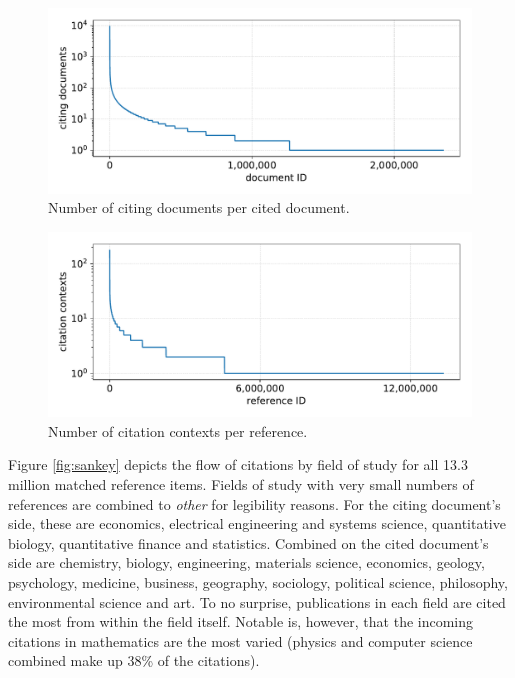\begin{figure}
  \centering
  \includegraphics[width=\linewidth]{figures/dataset/citing_docs_per_cited_doc.pdf}
  \caption{Number of citing documents per cited document.}
  \label{fig:numcitdoc}
\end{figure}

\begin{figure}
  \centering
  \includegraphics[width=\linewidth]{figures/dataset/citation_contexts_per_reference.pdf}
  \caption{Number of citation contexts per reference.}
  \label{fig:numcontref}
\end{figure}

Figure \ref{fig:sankey} depicts the flow of citations by field of study for all 13.3 million matched reference items. Fields of study with very small numbers of references are combined to \emph{other} for legibility reasons. For the citing document's side, these are economics, electrical engineering and systems science, quantitative biology, quantitative finance and statistics. Combined on the cited document's side are chemistry, biology, engineering, materials science, economics, geology, psychology, medicine, business, geography, sociology, political science, philosophy, environmental science and art. To no surprise, publications in each field are cited the most from within the field itself. Notable is, however, that the incoming citations in mathematics are the most varied (physics and computer science combined make up 38\% of the citations).

